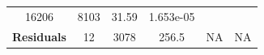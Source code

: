 \documentclass[]{article}
\begin{document}
\begin{longtable}[]{@{}cccccc@{}}
\begin{minipage}[t]{0.10\columnwidth}
16206
\strut\end{minipage} &
\begin{minipage}[t]{0.12\columnwidth}\centering\strut
8103
\strut\end{minipage} &
\begin{minipage}[t]{0.12\columnwidth}\centering\strut
31.59
\strut\end{minipage} &
\begin{minipage}[t]{0.12\columnwidth}\centering\strut
1.653e-05
\strut\end{minipage}\tabularnewline
\begin{minipage}[t]{0.19\columnwidth}\centering\strut
\textbf{Residuals}
\strut\end{minipage} &
\begin{minipage}[t]{0.06\columnwidth}\centering\strut
12
\strut\end{minipage} &
\begin{minipage}[t]{0.10\columnwidth}\centering\strut
3078
\strut\end{minipage} &
\begin{minipage}[t]{0.12\columnwidth}\centering\strut
256.5
\strut\end{minipage} &
\begin{minipage}[t]{0.12\columnwidth}\centering\strut
NA
\strut\end{minipage} &
\begin{minipage}[t]{0.12\columnwidth}\centering\strut
NA
\strut\end{minipage}\tabularnewline
\bottomrule
\end{longtable}
\end{document}
